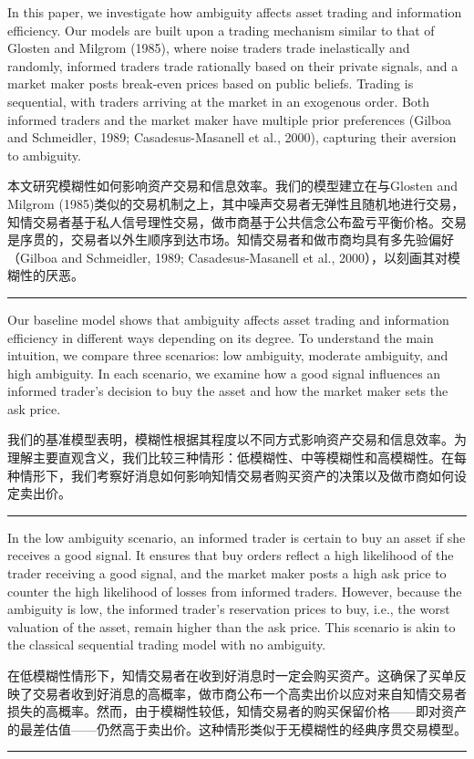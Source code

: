 \documentclass[12pt,a4paper]{article}
\newenvironment{original}{%
  \par\vspace{4pt}\noindent%
  \color{black}%
  \ignorespaces
}{%
  \par\vspace{2pt}%
}
\newenvironment{translation}{%
  \par\vspace{2pt}\noindent%
  \color{transblue}%
  \ignorespaces
}{%
  \par\vspace{4pt}\hrule\vspace{6pt}%
}
\begin{document}
\begin{original}
In this paper, we investigate how ambiguity affects asset trading and information efficiency. Our models are built upon a trading mechanism similar to that of Glosten and Milgrom (1985), where noise traders trade inelastically and randomly, informed traders trade rationally based on their private signals, and a market maker posts break-even prices based on public beliefs. Trading is sequential, with traders arriving at the market in an exogenous order. Both informed traders and the market maker have multiple prior preferences (Gilboa and Schmeidler, 1989; Casadesus-Masanell et al., 2000), capturing their aversion to ambiguity.
\end{original}
\begin{translation}
本文研究模糊性如何影响资产交易和信息效率。我们的模型建立在与Glosten and Milgrom (1985)类似的交易机制之上，其中噪声交易者无弹性且随机地进行交易，知情交易者基于私人信号理性交易，做市商基于公共信念公布盈亏平衡价格。交易是序贯的，交易者以外生顺序到达市场。知情交易者和做市商均具有多先验偏好（Gilboa and Schmeidler, 1989; Casadesus-Masanell et al., 2000），以刻画其对模糊性的厌恶。
\end{translation}

\begin{original}
Our baseline model shows that ambiguity affects asset trading and information efficiency in different ways depending on its degree. To understand the main intuition, we compare three scenarios: low ambiguity, moderate ambiguity, and high ambiguity. In each scenario, we examine how a good signal influences an informed trader's decision to buy the asset and how the market maker sets the ask price.
\end{original}
\begin{translation}
我们的基准模型表明，模糊性根据其程度以不同方式影响资产交易和信息效率。为理解主要直观含义，我们比较三种情形：低模糊性、中等模糊性和高模糊性。在每种情形下，我们考察好消息如何影响知情交易者购买资产的决策以及做市商如何设定卖出价。
\end{translation}

\begin{original}
In the low ambiguity scenario, an informed trader is certain to buy an asset if she receives a good signal. It ensures that buy orders reflect a high likelihood of the trader receiving a good signal, and the market maker posts a high ask price to counter the high likelihood of losses from informed traders. However, because the ambiguity is low, the informed trader's reservation prices to buy, i.e., the worst valuation of the asset, remain higher than the ask price. This scenario is akin to the classical sequential trading model with no ambiguity.
\end{original}
\begin{translation}
在低模糊性情形下，知情交易者在收到好消息时一定会购买资产。这确保了买单反映了交易者收到好消息的高概率，做市商公布一个高卖出价以应对来自知情交易者损失的高概率。然而，由于模糊性较低，知情交易者的购买保留价格——即对资产的最差估值——仍然高于卖出价。这种情形类似于无模糊性的经典序贯交易模型。
\end{translation}
\end{document}
